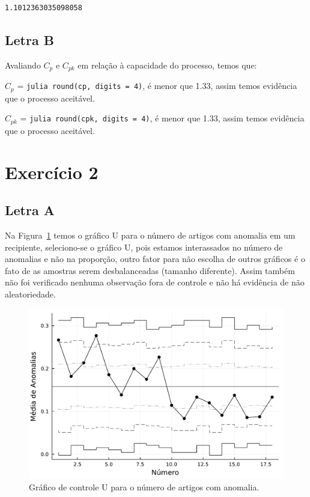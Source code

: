 \documentclass[
  letterpaper,
  DIV=11,
  numbers=noendperiod]{scrartcl}
\begin{document}
\begin{verbatim}
1.1012363035098058
\end{verbatim}

\hypertarget{letra-b}{%
\subsection{Letra B}\label{letra-b}}

Avaliando \(C_p\) e \(C_{pk}\) em relação à capacidade do processo,
temos que:

\(C_p\) = \texttt{julia\ round(cp,\ digits\ =\ 4)}, é menor que 1.33,
assim temos evidência que o processo aceitável.

\(C_{pk}\) = \texttt{julia\ round(cpk,\ digits\ =\ 4)}, é menor que
1.33, assim temos evidência que o processo aceitável.

\hypertarget{exercuxedcio-2}{%
\section{Exercício 2}\label{exercuxedcio-2}}

\hypertarget{letra-a-1}{%
\subsection{Letra A}\label{letra-a-1}}

Na Figura~\ref{fig-5} temos o gráfico U para o número de artigos com
anomalia em um recipiente, seleciono-se o gráfico U, pois estamos
interassados no número de anomalias e não na proporção, outro fator para
não escolha de outros gráficos é o fato de as amostras serem
desbalanceadas (tamanho diferente). Assim também não foi verificado
nenhuma observação fora de controle e não há evidência de não
aleatoriedade.

\begin{figure}[H]

{\centering \includegraphics{relatorio_files/figure-pdf/fig-5-J1.pdf}

}

\caption{\label{fig-5}Gráfico de controle U para o número de artigos com
anomalia.}

\end{figure}
\end{document}
